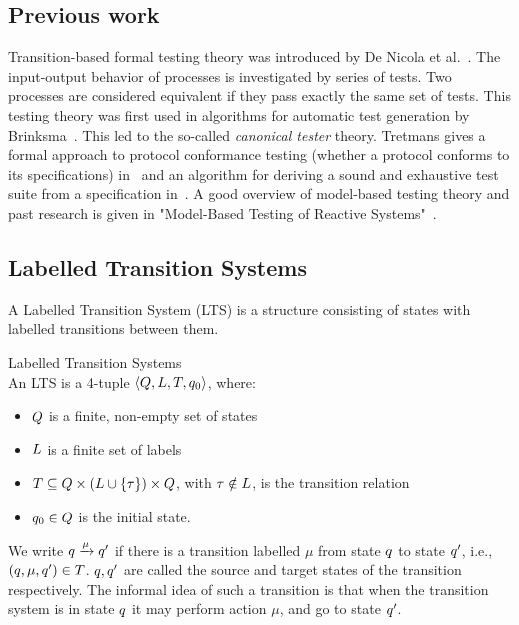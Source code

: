 \subsection{Previous work}
Transition-based formal testing theory was introduced by De Nicola et al.~\cite{denicola:testing}. The input-output behavior of processes is investigated by series of tests. Two processes are considered equivalent if they pass exactly the same set of tests. This testing theory was first used in algorithms for automatic test generation by Brinksma~\cite{brinksma:testgeneration}. This led to the so-called \textit{canonical tester} theory. Tretmans gives a formal approach to protocol conformance testing (whether a protocol conforms to its specifications) in~\cite{Tretmans:conformancetesting} and an algorithm for deriving a sound and exhaustive test suite from a specification in~\cite{Tretmans:testgeneration}. A good overview of model-based testing theory and past research is given in "Model-Based Testing of Reactive Systems"~\cite{Broy:ModelBasedTesting}.

\subsection{Labelled Transition Systems}
A Labelled Transition System (LTS) is a structure consisting of states with labelled transitions between them.
\vspace{10px}
\begin{definition} Labelled Transition Systems \\
An LTS is a 4-tuple	$\langle Q, L, T, q_0\rangle$, where:
\begin{itemize}
\item $Q$  is a finite, non-empty set of states
\item $L$  is a finite set of labels
\item {} $T \subseteq Q \times (L \cup \{\tau\}) \times Q$, with $\tau \notin L$, is the transition relation
\item {} $q_0 \in Q$ is the initial state.
\end{itemize}
We write $q \xrightarrow{\mu}q'$ if there is a transition labelled $\mu$ from state $q$ to state $q'$, i.e., $(q, \mu, q') \in T$. $q, q'$ are called the source and target states of the transition respectively. The informal idea of such a transition is that when the transition system is in state $q$ it may perform action $\mu$, and go to state $q'$.
\end{definition}

